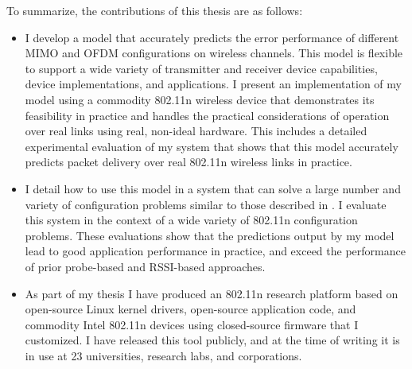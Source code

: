 To summarize, the contributions of this thesis are as follows:
\begin{itemize}[leftmargin=0.5cm,parsep=1ex,itemsep=1ex,topsep=1ex]
\item I develop a model that accurately predicts the error performance of different MIMO and OFDM configurations on wireless channels. This model is flexible to support a wide variety of transmitter and receiver device capabilities, device implementations, and applications. I present an implementation of my model using a commodity 802.11n wireless device that demonstrates its feasibility in practice and handles the practical considerations of operation over real links using real, non-ideal hardware. This includes a detailed experimental evaluation of my system that shows that this model accurately predicts packet delivery over real 802.11n wireless links in practice.

\item I detail how to use this model in a system that can solve a large number and variety of configuration problems similar to those described in . I evaluate this system in the context of a wide variety of 802.11n configuration problems.
These evaluations show that the predictions output by my model lead to good application performance in practice, and exceed the performance of prior probe-based and RSSI-based approaches.

\item As part of my thesis I have produced an 802.11n research platform based on open-source Linux kernel drivers, open-source application code, and commodity Intel 802.11n devices using closed-source firmware that I customized.
I have released this tool publicly, and at the time of writing it is in use at 23 universities, research labs, and corporations.
\end{itemize}

